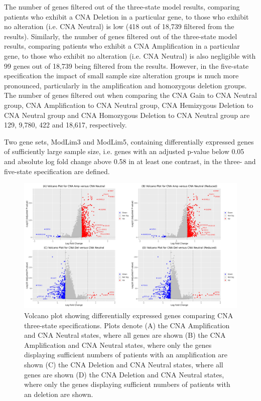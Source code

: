 The number of genes filtered out of the three-state model results, comparing patients who exhibit a CNA Deletion in a particular gene, to those who exhibit no alteration (i.e. CNA Neutral) is low (418 out of 18,739 filtered from the results). Similarly, the number of genes filtered out of the three-state model results, comparing patients who exhibit a CNA Amplification in a particular gene, to those who exhibit no alteration (i.e. CNA Neutral) is also negligible with 99 genes out of 18,739 being filtered from the results. However, in the five-state specification the impact of small sample size alteration groups is much more pronounced, particularly in the amplification and homozygous deletion groups. The number of genes filtered out when comparing the CNA Gain to CNA Neutral group, CNA Amplification to CNA Neutral group, CNA Hemizygous Deletion to CNA Neutral group and CNA Homozygous Deletion to CNA Neutral group are 129, 9,780, 422 and 18,617, respectively.  

Two gene sets, ModLim3 and ModLim5, containing differentially expressed genes of sufficiently large sample size, i.e. genes with an adjusted p-value below 0.05 and absolute log fold change above 0.58 in at least one contrast, in the three- and five-state specification are defined. 

\vfill 
\begin{figure}[!h]
\includegraphics[width=1\textwidth]{../figures/Chapter_4/Volcano_CNA_3State.png}
\caption[Volcano plot showing differentially expressed genes comparing CNA three-state specifications.]{Volcano plot showing differentially expressed genes comparing CNA three-state specifications. Plots denote (A) the CNA Amplification and CNA Neutral states, where all genes are shown (B) the CNA Amplification and CNA Neutral states, where only the genes displaying sufficient numbers of patients with an amplification are shown (C) the CNA Deletion and CNA Neutral states, where all genes are shown (D) the CNA Deletion and CNA Neutral states, where only the genes displaying sufficient numbers of patients with an deletion are shown.}
\label{fig:Volcano3}
\end{figure}
\vfill 


